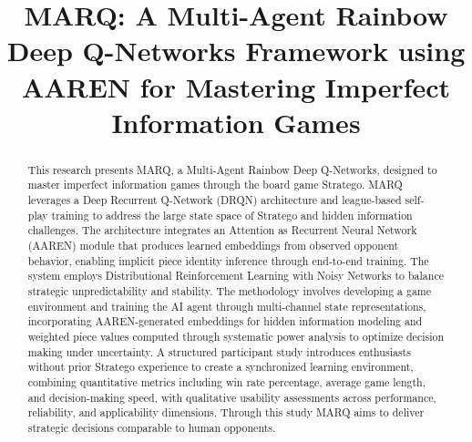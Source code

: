 \documentclass[oneside]{etd}
\title{MARQ: A Multi-Agent Rainbow Deep Q-Networks Framework using AAREN for Mastering Imperfect Information Games}
\begin{document}
\maketitle
\makerecomm
\makeacceptance
\makedeclaration


\begin{abstract}
This research presents MARQ, a Multi-Agent Rainbow Deep Q-Networks, designed to master imperfect information games through the board game Stratego. MARQ leverages a Deep Recurrent Q-Network (DRQN) architecture and league-based self-play training to address the large state space of Stratego and hidden information challenges. The architecture integrates an Attention as Recurrent Neural Network (AAREN) module that produces learned embeddings from observed opponent behavior, enabling implicit piece identity inference through end-to-end training. The system employs Distributional Reinforcement Learning with Noisy Networks to balance strategic unpredictability and stability. The methodology involves developing a game environment and training the AI agent through multi-channel state representations, incorporating AAREN-generated embeddings for hidden information modeling and weighted piece values computed through systematic power analysis to optimize decision making under uncertainty. A structured participant study introduces enthusiasts without prior Stratego experience to create a synchronized learning environment, combining quantitative metrics including win rate percentage, average game length, and decision-making speed, with qualitative usability assessments across performance, reliability, and applicability dimensions. Through this study MARQ aims to deliver strategic decisions comparable to human opponents.
\end{abstract}




\begingroup
\renewcommand*{\addvspace}[1]{}
\tableofcontents
\listoffigures
\listoftables
\endgroup

\beginbody
{}










%   
%   
%   
%   
%   

\nocite{*}

{
\singlespace

}


\end{document}
